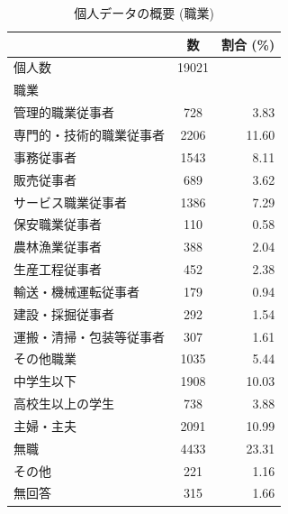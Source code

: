 \documentclass[a4paper,12pt, uplatex]{jsbook}
\begin{document}
\begin{table}[h]
    \centering
    \caption{個人データの概要 (職業)}
    \begin{tabular}{lcr}
        \toprule
        & 数 & 割合 (\%) \\
        \midrule
        個人数 & 19021 & \\

        職業 & & \\
        \hspace{1em} 管理的職業従事者 & 728 & 3.83 \\
        \hspace{1em} 専門的・技術的職業従事者 & 2206 & 11.60 \\
        \hspace{1em} 事務従事者 & 1543 & 8.11 \\
        \hspace{1em} 販売従事者 & 689 & 3.62 \\
        \hspace{1em} サービス職業従事者 & 1386 & 7.29 \\
        \hspace{1em} 保安職業従事者 & 110 & 0.58 \\
        \hspace{1em} 農林漁業従事者 & 388 & 2.04 \\
        \hspace{1em} 生産工程従事者 & 452	 & 2.38 \\
        \hspace{1em} 輸送・機械運転従事者 & 179 & 0.94 \\
        \hspace{1em} 建設・採掘従事者 & 292 & 1.54 \\
        \hspace{1em} 運搬・清掃・包装等従事者 & 307 & 1.61 \\
        \hspace{1em} その他職業 & 1035 & 5.44 \\
        \hspace{1em} 中学生以下 & 1908 & 10.03 \\
        \hspace{1em} 高校生以上の学生 & 738 & 3.88 \\
        \hspace{1em} 主婦・主夫 & 2091 & 10.99 \\
        \hspace{1em} 無職 & 4433	 & 23.31 \\
        \hspace{1em} その他 & 221	 & 1.16 \\
        \hspace{1em} 無回答 & 315	 & 1.66 \\



\end{tabular}
\end{table}
\end{document}

